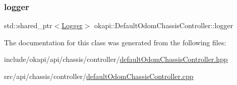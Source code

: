 \mbox{\label{classokapi_1_1DefaultOdomChassisController_a1e34483ae1bcef368d80b69f54a3b091}} 
\subsubsection{\texorpdfstring{logger}{logger}}
{\footnotesize\ttfamily std\+::shared\+\_\+ptr$<$\mbox{\hyperlink{classokapi_1_1Logger}{Logger}}$>$ okapi\+::\+Default\+Odom\+Chassis\+Controller\+::logger\hspace{0.3cm}{\ttfamily [protected]}}



The documentation for this class was generated from the following files\+:\begin{DoxyCompactItemize}
\item 
include/okapi/api/chassis/controller/\mbox{\hyperlink{defaultOdomChassisController_8hpp}{default\+Odom\+Chassis\+Controller.\+hpp}}\item 
src/api/chassis/controller/\mbox{\hyperlink{defaultOdomChassisController_8cpp}{default\+Odom\+Chassis\+Controller.\+cpp}}\end{DoxyCompactItemize}
